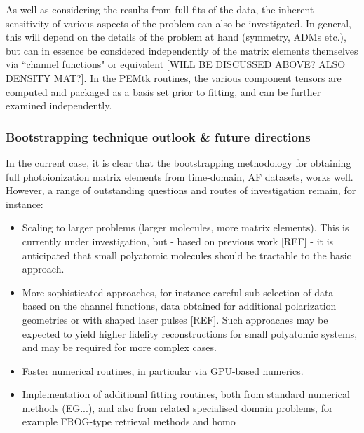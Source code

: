 As well as considering the results from full fits of the data, the inherent sensitivity of various aspects of the problem can also be investigated. In general, this will depend on the details of the problem at hand (symmetry, ADMs etc.), but can in essence be considered independently of the matrix elements themselves via ``channel functions" or equivalent [WILL BE DISCUSSED ABOVE? ALSO DENSITY MAT?]. In the PEMtk routines, the various component tensors are computed and packaged as a basis set prior to fitting, and can be further examined independently.


\subsubsection{Bootstrapping technique outlook \& future directions}

In the current case, it is clear that the bootstrapping methodology for obtaining full photoionization matrix elements from time-domain, AF datasets, works well. However, a range of outstanding questions and routes of investigation remain, for instance:

\begin{itemize}
\item Scaling to larger problems (larger molecules, more matrix elements). This is currently under investigation, but - based on previous work [REF] - it is anticipated that small polyatomic molecules should be tractable to the basic approach. 
\item More sophisticated approaches, for instance careful sub-selection of data based on the channel functions, data obtained for additional polarization geometries or with shaped laser pulses [REF]. Such approaches may be expected to yield higher fidelity reconstructions for small polyatomic systems, and may be required for more complex cases.
\item Faster numerical routines, in particular via GPU-based numerics.
\item Implementation of additional fitting routines, both from standard numerical methods (EG...), and also from related specialised domain problems, for example FROG-type retrieval methods and homo 
\end{itemize}
